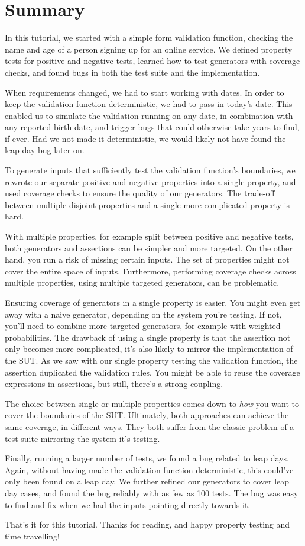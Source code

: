 \section{Summary}\label{summary}

In this tutorial, we started with a simple form validation function,
checking the name and age of a person signing up for an online service.
We defined property tests for positive and negative tests, learned how
to test generators with coverage checks, and found bugs in both the test
suite and the implementation.

When requirements changed, we had to start working with dates. In order
to keep the validation function deterministic, we had to pass in today's
date. This enabled us to simulate the validation running on any date, in
combination with any reported birth date, and trigger bugs that could
otherwise take years to find, if ever. Had we not made it deterministic,
we would likely not have found the leap day bug later on.

To generate inputs that sufficiently test the validation function's
boundaries, we rewrote our separate positive and negative properties
into a single property, and used coverage checks to ensure the quality
of our generators. The trade-off between multiple disjoint properties
and a single more complicated property is hard.

With multiple properties, for example split between positive and
negative tests, both generators and assertions can be simpler and more
targeted. On the other hand, you run a risk of missing certain inputs.
The set of properties might not cover the entire space of inputs.
Furthermore, performing coverage checks across multiple properties,
using multiple targeted generators, can be problematic.

Ensuring coverage of generators in a single property is easier. You
might even get away with a naive generator, depending on the system
you're testing. If not, you'll need to combine more targeted generators,
for example with weighted probabilities. The drawback of using a single
property is that the assertion not only becomes more complicated, it's
also likely to mirror the implementation of the SUT. As we saw with our
single property testing the validation function, the assertion
duplicated the validation rules. You might be able to reuse the coverage
expressions in assertions, but still, there's a strong coupling.

The choice between single or multiple properties comes down to
\emph{how} you want to cover the boundaries of the SUT. Ultimately, both
approaches can achieve the same coverage, in different ways. They both
suffer from the classic problem of a test suite mirroring the system
it's testing.

Finally, running a larger number of tests, we found a bug related to
leap days. Again, without having made the validation function
deterministic, this could've only been found on a leap day. We further
refined our generators to cover leap day cases, and found the bug
reliably with as few as 100 tests. The bug was easy to find and fix when
we had the inputs pointing directly towards it.

That's it for this tutorial. Thanks for reading, and happy property
testing and time travelling!
